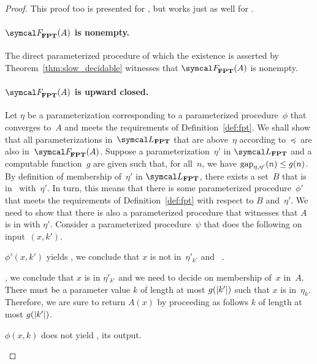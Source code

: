 \begin{proof}
  This proof too is presented for , but works just as well for .

  \paragraph{$\calF_\cl{FPT}(A)$ is nonempty.}
  The direct parameterized procedure of which the existence is asserted by Theorem~\ref{thm:slow_decidable} witnesses that $\calF_\cl{FPT}(A)$ is nonempty.

  \paragraph{$\calF_\cl{FPT}(A)$ is upward closed.}
  Let $\eta$ be a parameterization corresponding to a parameterized procedure~$\phi$ that converges to~$A$ and meets the requirements of Definition~\ref{def:fpt}.
  We shall show that all parameterizations in~$\calL_\cl{FPT}$ that are above~$\eta$ according to~$\preccurlyeq$ are also in~$\calF_\cl{FPT}(A)$.
  Suppose a parameterization~$\eta'$ in $\calL_\cl{FPT}$ and a computable function~$g$ are given such that, for all~$n$, we have $\operatorname{gap}_{\eta, \eta'}(n) \le g(n)$.
  By definition of membership of~$\eta'$ in $\calL_\cl{FPT}$, there exists a set~$B$ that is in~ with~$\eta'$.
  In turn, this means that there is some parameterized procedure~$\phi'$ that meets the requirements of Definition~\ref{def:fpt} with respect to $B$ and~$\eta'$.
  We need to show that there is also a parameterized procedure that witnesses that $A$ is in  with $\eta'$.
  Consider a parameterized procedure~$\psi$ that does the following on input~$(x, k')$.
  \begin{codelisting}
  \item
     $\phi'(x, k')$ yields , we conclude that $x$ is not in~$\eta'_{k'}$ and ~.
  \item\label{code:filter:upward:loop}%
    , we conclude that $x$ is in $\eta'_{k'}$ and we need to decide on membership of~$x$ in~$A$.
    There must be a parameter value $k$ of length at most $g(\length{k'})$ such that $x$ is in~$\eta_k$.
    Therefore, we are sure to return $A(x)$ by proceeding as follows  $k$ of length at most $g(\length{k'})$.
    \begin{codelisting}
    \item {} $\phi(x, k)$ does not yield ,  its output.
    \end{codelisting}
  \end{codelisting}


\end{proof}
